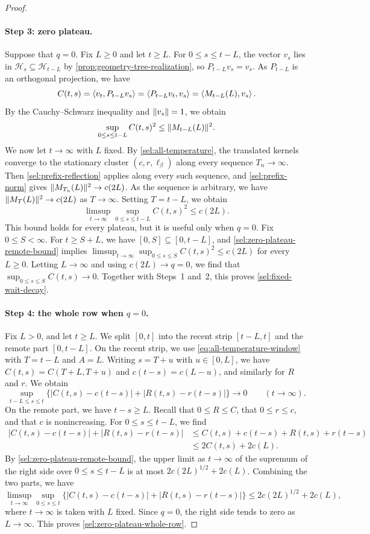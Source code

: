\begin{proof}
\paragraph{Step 3: zero plateau.}
Suppose that $q=0$. Fix $L\ge0$ and let $t\ge L$. For $0\le s\le t-L$, the vector $v_s$ lies in $\mathcal H_s\subseteq\mathcal H_{t-L}$ by \cref{prop:geometry-tree-realization}, so $P_{t-L}v_s=v_s$. As $P_{t-L}$ is an orthogonal projection, we have
\[
 C(t,s)=\left\langle v_t,P_{t-L}v_s\right\rangle=\left\langle P_{t-L}v_t,v_s\right\rangle=\left\langle M_{t-L}(L),v_s\right\rangle.
\]
By the Cauchy--Schwarz inequality and $\lVert v_s\rVert=1$, we obtain
\[
 \sup_{0\le s\le t-L}C(t,s)^2\le\lVert M_{t-L}(L)\rVert^2.
\]
We now let $t\to\infty$ with $L$ fixed. By \cref{sel:all-temperature}, the translated kernels converge to the stationary cluster $(c,r,\ell_\beta)$ along every sequence $T_n\to\infty$. Then \cref{sel:prefix-reflection} applies along every such sequence, and \eqref{sel:prefix-norm} gives $\lVert M_{T_n}(L)\rVert^2\to c(2L)$. As the sequence is arbitrary, we have $\lVert M_T(L)\rVert^2\to c(2L)$ as $T\to\infty$. Setting $T=t-L$, we obtain
\begin{equation}
 \limsup_{t\to\infty}\sup_{0\le s\le t-L}C(t,s)^2\le c(2L).
 \label{sel:zero-plateau-remote-bound}
\end{equation}
This bound holds for every plateau, but it is useful only when $q=0$. Fix $0\le S<\infty$. For $t\ge S+L$, we have $[0,S]\subseteq[0,t-L]$, and \eqref{sel:zero-plateau-remote-bound} implies $\limsup_{t\to\infty}\sup_{0\le s\le S}C(t,s)^2\le c(2L)$ for every $L\ge0$. Letting $L\to\infty$ and using $c(2L)\to q=0$, we find that $\sup_{0\le s\le S}C(t,s)\to0$. Together with Steps~1 and~2, this proves \eqref{sel:fixed-wait-decay}.

\paragraph{Step 4: the whole row when $q=0$.}
Fix $L>0$, and let $t\ge L$. We split $[0,t]$ into the recent strip $[t-L,t]$ and the remote part $[0,t-L]$. On the recent strip, we use \eqref{eq:all-temperature-window} with $T=t-L$ and $A=L$. Writing $s=T+u$ with $u\in[0,L]$, we have $C(t,s)=C(T+L,T+u)$ and $c(t-s)=c(L-u)$, and similarly for $R$ and $r$. We obtain
\[
 \sup_{t-L\le s\le t}
 \bigl\{|C(t,s)-c(t-s)|+|R(t,s)-r(t-s)|\bigr\}\longrightarrow0
 \qquad(t\to\infty).
\]
On the remote part, we have $t-s\ge L$. Recall that $0\le R\le C$, that $0\le r\le c$, and that $c$ is nonincreasing. For $0\le s\le t-L$, we find
\[
\begin{aligned}
 |C(t,s)-c(t-s)|+|R(t,s)-r(t-s)|
 &\le C(t,s)+c(t-s)+R(t,s)+r(t-s)\\
 &\le2C(t,s)+2c(L).
\end{aligned}
\]
By \eqref{sel:zero-plateau-remote-bound}, the upper limit as $t\to\infty$ of the supremum of the right side over $0\le s\le t-L$ is at most $2c(2L)^{1/2}+2c(L)$. Combining the two parts, we have
\[
 \limsup_{t\to\infty}\sup_{0\le s\le t}
 \bigl\{|C(t,s)-c(t-s)|+|R(t,s)-r(t-s)|\bigr\}
 \le2c(2L)^{1/2}+2c(L),
\]
where $t\to\infty$ is taken with $L$ fixed. Since $q=0$, the right side tends to zero as $L\to\infty$. This proves \eqref{sel:zero-plateau-whole-row}.
\end{proof}

